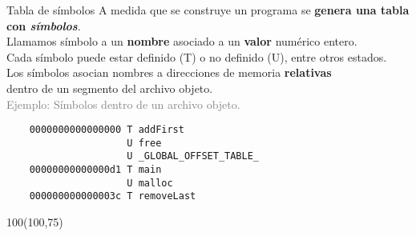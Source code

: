 \documentclass[aspectratio=169]{beamer}
\begin{document}
\begin{frame}[fragile,t]{Tabla de símbolos}
    A medida que se construye un programa se \textbf{genera una tabla con \emph{símbolos}}.\\
    \bigskip
    Llamamos símbolo a un \textbf{nombre} asociado a un \textbf{valor} numérico entero.\\
    Cada símbolo puede estar definido (T) o no definido (U), entre otros estados.\\
    \bigskip
    Los símbolos asocian nombres a direcciones de memoria \textbf{relativas}\\ dentro de un segmento del archivo objeto.\\
    \pause
    \bigskip
    \textcolor{gray}{Ejemplo: Símbolos dentro de un archivo objeto.}
    { \small
    \begin{verbatim}
    0000000000000000 T addFirst
                     U free
                     U _GLOBAL_OFFSET_TABLE_
    00000000000000d1 T main
                     U malloc
    000000000000003c T removeLast
    \end{verbatim} }
    \begin{textblock}{100}(100,75)
    \end{textblock}
\end{frame}
\end{document}
